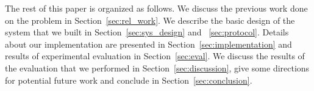 The rest of this paper is organized as follows. We discuss the previous work done on the problem in Section~\ref{sec:rel_work}. We describe the basic design of the 
system that we built in Section~\ref{sec:sys_design} and ~\ref{sec:protocol}. Details about our implementation are presented in Section~\ref{sec:implementation} 
and results of experimental evaluation in Section~\ref{sec:eval}. We discuss the results of the evaluation that we performed in Section~\ref{sec:discussion}, give 
some directions for potential future work and conclude in Section~\ref{sec:conclusion}.
